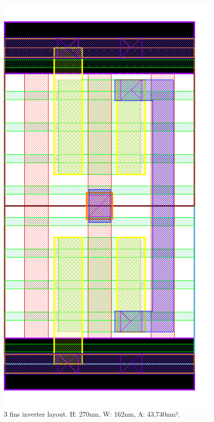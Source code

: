 \documentclass[diss,pgmicro,english]{iiufrgs}
\begin{document}
\begin{figure}[]
\centering
\includegraphics[width=\textwidth,height=\textheight,keepaspectratio]{INV3F.png}
\caption{3 fins inverter layout. H: 270nm, W: 162nm, A: 43,740nm².}
\label{fig:INV3F}
\end{figure}
\end{document}

